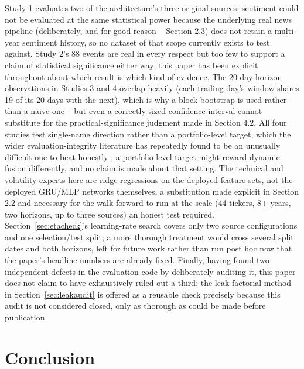 \documentclass[10pt,a4paper,twocolumn]{article}
\begin{document}
Study 1 evaluates two of the architecture's three original sources; sentiment could not be evaluated at the same statistical power because the underlying real news pipeline (deliberately, and for good reason -- Section 2.3) does not retain a multi-year sentiment history, so no dataset of that scope currently exists to test against. Study 2's 88 events are real in every respect but too few to support a claim of statistical significance either way; this paper has been explicit throughout about which result is which kind of evidence. The 20-day-horizon observations in Studies 3 and 4 overlap heavily (each trading day's window shares 19 of its 20 days with the next), which is why a block bootstrap is used rather than a naive one -- but even a correctly-sized confidence interval cannot substitute for the practical-significance judgment made in Section 4.2. All four studies test single-name direction rather than a portfolio-level target, which the wider evaluation-integrity literature has repeatedly found to be an unusually difficult one to beat honestly \cite{gu2020,fama1970}; a portfolio-level target might reward dynamic fusion differently, and no claim is made about that setting. The technical and volatility experts here are ridge regressions on the deployed feature sets, not the deployed GRU/MLP networks themselves, a substitution made explicit in Section 2.2 and necessary for the walk-forward to run at the scale (44 tickers, 8+ years, two horizons, up to three sources) an honest test required. Section~\ref{sec:etacheck}'s learning-rate search covers only two source configurations and one selection/test split; a more thorough treatment would cross several split dates and both horizons, left for future work rather than run post hoc now that the paper's headline numbers are already fixed. Finally, having found two independent defects in the evaluation code by deliberately auditing it, this paper does not claim to have exhaustively ruled out a third; the leak-factorial method in Section~\ref{sec:leakaudit} is offered as a reusable check precisely because this audit is not considered closed, only as thorough as could be made before publication.

\section{Conclusion}
\end{document}

